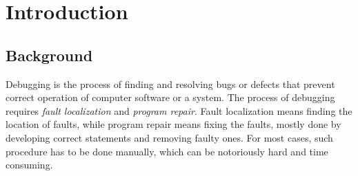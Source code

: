 \section{Introduction}
\label{section:Introduction}
\subsection{Background}
\label{section:Background}
Debugging is the process of finding and resolving bugs or defects that prevent correct operation of computer software or a system\cite{APD}.
The process of debugging requires {\it fault localization} and {\it program repair}\cite{SPBPRUS}.
Fault localization means finding the location of faults,
while program repair means fixing the faults, mostly done by developing correct statements and removing faulty ones\cite{LCoPF}.
For most cases, such procedure has to be done manually, which can be notoriously hard and time consuming.

